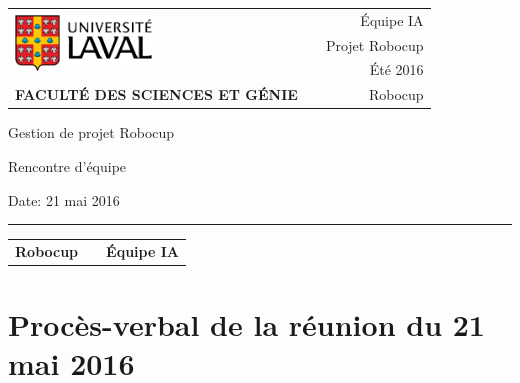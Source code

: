 \documentclass[12pt,letterpaper,twoside]{article}
\begin{document}
\setcounter{secnumdepth}{0}
\begin{titlepage}

        \vspace*{1cm}
        \begin{small}
        \begin{tabularx}{\textwidth}{ l X r }
        \multirow{3}{*}{\includegraphics[height=1.5cm,keepaspectratio]{ul_logo.pdf}}
        && \'Equipe IA\\
        && Projet Robocup\\
        && Été 2016\\

        \scriptsize{\textbf{FACULTÉ DES SCIENCES ET GÉNIE}} && Robocup
        \end{tabularx}
        \end{small}

        \vfill

        \begin{center}

        Gestion de projet Robocup

        \vspace{0.5cm}

        Rencontre d'\'equipe

        \vspace{2cm}

        \end{center}

        \vfill

        Date: 21 mai 2016

        \vspace{0.4cm}

        \rule{\textwidth}{2pt}

        \vspace{0.3cm}

        \begin{tabularx}{\textwidth}{ l X r }

        \textbf{Robocup} && \textbf{\'Equipe IA} \\

        \end{tabularx}


\end{titlepage}


\section*{Proc\`es-verbal de la réunion du 21 mai 2016}
\end{document}
